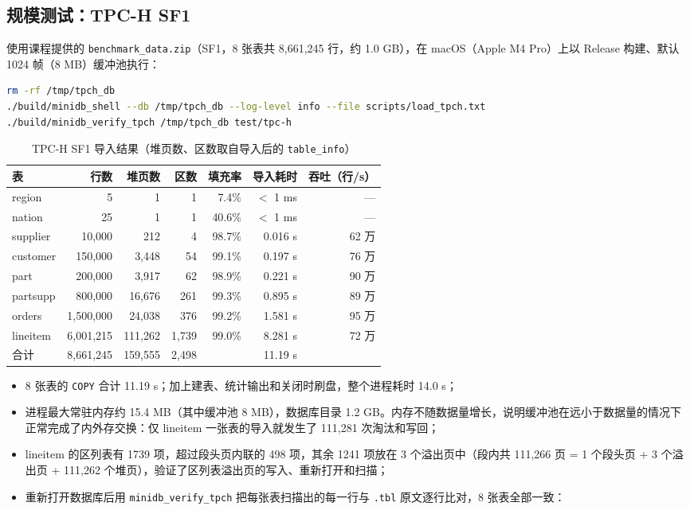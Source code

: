 \documentclass[11pt,a4paper]{ctexart}
\newcommand{\code}[1]{\texttt{#1}}
\begin{document}
\subsection{规模测试：TPC-H SF1}

使用课程提供的 \code{benchmark\_data.zip}（SF1，8 张表共 8,661,245 行，约 1.0 GB），在 macOS（Apple M4 Pro）上以 Release 构建、默认 1024 帧（8 MB）缓冲池执行：

\begin{lstlisting}[language=bash,style=plain]
rm -rf /tmp/tpch_db
./build/minidb_shell --db /tmp/tpch_db --log-level info --file scripts/load_tpch.txt
./build/minidb_verify_tpch /tmp/tpch_db test/tpc-h
\end{lstlisting}

\begin{table}[H]
  \centering
  \caption{TPC-H SF1 导入结果（堆页数、区数取自导入后的 \code{table\_info}）}
  \begin{tabular}{l r r r r r r}
    \toprule
    表 & 行数 & 堆页数 & 区数 & 填充率 & 导入耗时 & 吞吐（行/s） \\
    \midrule
    region & 5 & 1 & 1 & 7.4\% & $<$ 1 ms & — \\
    nation & 25 & 1 & 1 & 40.6\% & $<$ 1 ms & — \\
    supplier & 10,000 & 212 & 4 & 98.7\% & 0.016 s & 62 万 \\
    customer & 150,000 & 3,448 & 54 & 99.1\% & 0.197 s & 76 万 \\
    part & 200,000 & 3,917 & 62 & 98.9\% & 0.221 s & 90 万 \\
    partsupp & 800,000 & 16,676 & 261 & 99.3\% & 0.895 s & 89 万 \\
    orders & 1,500,000 & 24,038 & 376 & 99.2\% & 1.581 s & 95 万 \\
    lineitem & 6,001,215 & 111,262 & 1,739 & 99.0\% & 8.281 s & 72 万 \\
    \midrule
    合计 & 8,661,245 & 159,555 & 2,498 & & 11.19 s & \\
    \bottomrule
  \end{tabular}
\end{table}

\begin{itemize}
  \item 8 张表的 \code{COPY} 合计 11.19 s；加上建表、统计输出和关闭时刷盘，整个进程耗时 14.0 s；
  \item 进程最大常驻内存约 15.4 MB（其中缓冲池 8 MB），数据库目录 1.2 GB。内存不随数据量增长，说明缓冲池在远小于数据量的情况下正常完成了内外存交换：仅 lineitem 一张表的导入就发生了 111,281 次淘汰和写回；
  \item lineitem 的区列表有 1739 项，超过段头页内联的 498 项，其余 1241 项放在 3 个溢出页中（段内共 111,266 页 = 1 个段头页 + 3 个溢出页 + 111,262 个堆页），验证了区列表溢出页的写入、重新打开和扫描；
  \item 重新打开数据库后用 \code{minidb\_verify\_tpch} 把每张表扫描出的每一行与 \code{.tbl} 原文逐行比对，8 张表全部一致：
\end{itemize}
\end{document}
